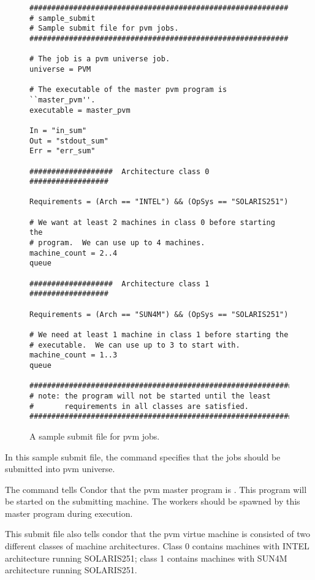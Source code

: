 \begin{figure}[ht]
\begin{small}
\begin{verbatim}
###########################################################
# sample_submit
# Sample submit file for pvm jobs. 
###########################################################

# The job is a pvm universe job.
universe = PVM  

# The executable of the master pvm program is ``master_pvm''.
executable = master_pvm

In = "in_sum"
Out = "stdout_sum"
Err = "err_sum"

###################  Architecture class 0  ##################

Requirements = (Arch == "INTEL") && (OpSys == "SOLARIS251") 

# We want at least 2 machines in class 0 before starting the 
# program.  We can use up to 4 machines.
machine_count = 2..4  
queue

###################  Architecture class 1  ##################

Requirements = (Arch == "SUN4M") && (OpSys == "SOLARIS251") 

# We need at least 1 machine in class 1 before starting the 
# executable.  We can use up to 3 to start with.
machine_count = 1..3
queue

###############################################################
# note: the program will not be started until the least 
#       requirements in all classes are satisfied.
###############################################################
\end{verbatim}
\end{small}

\label{pvm_submit}
\caption{A sample submit file for pvm jobs.}
\end{figure}

In this sample submit file, the command 
specifies that the jobs should be submitted into pvm universe.

The command  tells Condor that the pvm
master program is .  This program will be started on
the submitting machine.  The workers should be spawned by this master
program during execution.

This submit file also tells condor that the pvm virtue machine is
consisted of two different classes of machine architectures.  Class
0 contains machines with INTEL architecture running SOLARIS251; class
1 contains machines with SUN4M architecture running SOLARIS251.

